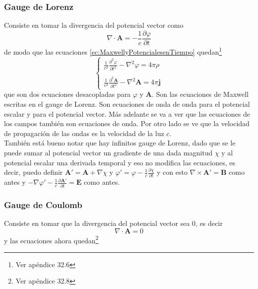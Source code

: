 \subsubsection{Gauge de Lorenz}
Consiste en tomar la divergencia del potencial vector como
\begin{equation*}
    \nabla \cdot \textbf{A} = -\frac{1}{c}\frac{\partial \varphi}{\partial t}
\end{equation*}
de modo que las ecuaciones \eqref{ec:MaxwellyPotencialesenTiempo} quedan\footnote{Ver apéndice 32.6}
\begin{equation*}
    \left\{
        \begin{matrix}
            \frac{1}{c^{2}}\frac{\partial^{2}\varphi}{\partial t^{2}} - \nabla^{2}\varphi = 4\pi\rho\\
            \\
            \frac{1}{c^{2}}\frac{\partial^{2}\textbf{A}}{\partial t^{2}} - \nabla^{2}\textbf{A} = 4\pi\textbf{j}
        \end{matrix}
    \right.
\end{equation*}
que son dos ecuaciones desacopladas para $\varphi$ y $\textbf{A}$. Son las ecuaciones de Maxwell escritas en el gauge de Lorenz. Son ecuaciones de onda de onda para el potencial escalar y para el potencial vector. Más adelante se va a ver que las ecuaciones de los campos también son ecuaciones de onda. Por otro lado se ve que la velocidad de propagación de las ondas es la velocidad de la luz $c$.\\
\indent También está bueno notar que hay infinitos gauge de Lorenz, dado que se le puede sumar al potencial vector un gradiente de una dada magnitud $\chi$ y al potencial escalar una derivada temporal y eso no modifica las ecuaciones, es decir, puedo definir $\textbf{A}' = \textbf{A} + \nabla \chi$ y $\varphi' = \varphi - \frac{1}{c}\frac{\partial \chi}{\partial t}$ y con esto $\nabla \times \textbf{A}' = \textbf{B}$ como antes y $-\nabla \varphi' - \frac{1}{c}\frac{\partial \textbf{A}'}{\partial t} = \textbf{E}$ como antes.



\subsubsection{Gauge de Coulomb}
Consiste en tomar que la divergencia del potencial vector sea 0, es decir
\begin{equation*}
    \nabla\cdot \textbf{A} = 0
\end{equation*}
y las ecuaciones ahora quedan\footnote{Ver apéndice 32.8}

